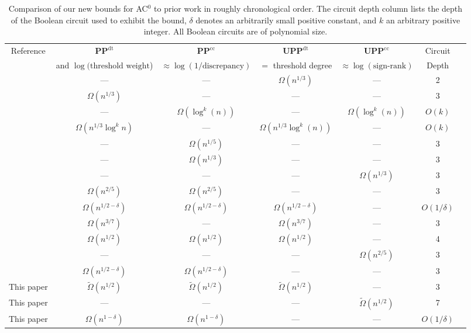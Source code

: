\documentclass{toc}
\newcommand{\PP}{\mathbf{PP}}
\newcommand{\UPP}{\mathbf{UPP}}
\begin{document}
\begin{table}
	{\small
		\centering
		\setlength\tabcolsep{1.7pt}
		\begin{tabular}{|c|c|c|c|c|c|c|}
			\hline
			Reference & $\PP^{\text{dt}}$ & $\PP^{\text{cc}}$   &$\UPP^{\text{dt}}$    &  $\UPP^{\text{cc}}$ & Circuit\\
			& and $\log(\text{threshold weight}$) & $\approx \log(1/\text{discrepancy})$ & $=$ threshold degree  & $\approx \log(\text{sign-rank})$ &	Depth\\
			\hline
			\cite{mp} & --- & --- & $\Omega(n^{1/3})$ & --- & 2\\
			\hline
			\cite{kp}& $\Omega(n^{1/3})$ & ---  & --- & --- & 3 \\
			\hline
			\cite{forster} & --- & $\Omega(\log^k(n))$ & --- & $\Omega(\log^k(n))$ & $O(k)$\\
			\hline
			\cite{osnewbounds} & $\Omega(n^{1/3} \log^k n)$ & --- & $\Omega(n^{1/3} \log^k(n))$ & --- & $O(k)$\\
			\hline
			\cite{sherstovmajmaj}& --- &  $\Omega(n^{1/5})$ & --- & ---  & 3\\
			\hline
			\cite{bvdw, patmat} & --- &  $\Omega(n^{1/3})$  & ---  & --- & 3\\
			\hline
			\cite{razborovsherstov} & --- & --- & --- & $\Omega(n^{1/3})$ & 3\\
			\hline
			\cite{bt14} & $\Omega(n^{2/5})$ & $\Omega(n^{2/5})$ & --- & ---  & 3\\
			\hline
			\cite{sherstov14}&$\Omega(n^{1/2-\delta})$   & $\Omega(n^{1/2-\delta})$ 
			& $\Omega(n^{1/2-\delta})$ & ---& $O(1/\delta)$\\
			\hline
			\cite{sherstov15} & $\Omega(n^{3/7})$ & ---& $\Omega(n^{3/7})$ &--- & 3\\
			\hline
			\cite{sherstov15} & $\Omega(n^{1/2})$  & $\Omega(n^{1/2})$ & $\Omega(n^{1/2})$ &--- & 4\\
			\hline
			\cite{bt16} & --- & --- & --- & $\Omega(n^{2/5})$ & 3\\
			\hline
			\cite{dlweight} & $\Omega(n^{1/2 - \delta})$  & $\Omega(n^{1/2 - \delta})$ & ---  & --- & 3\\
			\hline %
			This paper & $\tilde{\Omega}(n^{1/2})$  &$\tilde{\Omega}(n^{1/2})$  & $\tilde{\Omega}(n^{1/2})$ & --- & 3\\
			\hline
			This paper & ---  & --- & --- & $\tilde{\Omega}(n^{1/2})$ & 7\\
			\hline
			This paper & $\Omega(n^{1 - \delta})$  & $\Omega(n^{1 - \delta})$ & ---  & --- & $O(1/\delta)$\\  %
			\hline
		\end{tabular}
		\caption{Comparison of our new bounds for AC$^0$ to prior work in roughly chronological order. The circuit depth column lists the depth of the Boolean circuit used to exhibit the bound, $\delta$ denotes an arbitrarily small positive constant, and $k$ an arbitrary positive integer. All Boolean circuits are of polynomial size.
		}
		\label{tab:tab}
	}
\end{table}
\end{document}
